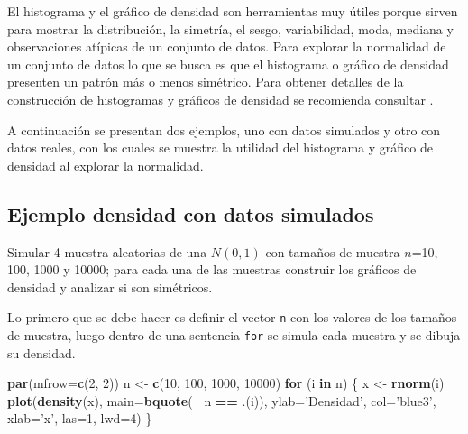 \documentclass[10pt,]{krantz}
\makeatletter
\newenvironment{Shaded}{\begin{snugshade}}{\end{snugshade}}
\newcommand{\KeywordTok}[1]{\textcolor[rgb]{0.13,0.29,0.53}{\textbf{#1}}}
\newcommand{\DataTypeTok}[1]{\textcolor[rgb]{0.13,0.29,0.53}{#1}}
\newcommand{\DecValTok}[1]{\textcolor[rgb]{0.00,0.00,0.81}{#1}}
\newcommand{\StringTok}[1]{\textcolor[rgb]{0.31,0.60,0.02}{#1}}
\newcommand{\ControlFlowTok}[1]{\textcolor[rgb]{0.13,0.29,0.53}{\textbf{#1}}}
\newcommand{\OperatorTok}[1]{\textcolor[rgb]{0.81,0.36,0.00}{\textbf{#1}}}
\newcommand{\NormalTok}[1]{#1}
\newenvironment{kframe}{%
\medskip{}
\setlength{\fboxsep}{.8em}
 \def\at@end@of@kframe{}%
 \ifinner\ifhmode%
  \def\at@end@of@kframe{\end{minipage}}%
  \begin{minipage}{\columnwidth}%
 \fi\fi%
 \def\FrameCommand##1{\hskip\@totalleftmargin \hskip-\fboxsep
 \colorbox{shadecolor}{##1}\hskip-\fboxsep
     \hskip-\linewidth \hskip-\@totalleftmargin \hskip\columnwidth}%
 \MakeFramed {\advance\hsize-\width
   \@totalleftmargin\z@ \linewidth\hsize
   \@setminipage}}%
 {\par\unskip\endMakeFramed%
 \at@end@of@kframe}
\renewenvironment{Shaded}{\begin{kframe}}{\end{kframe}}
\makeatother
\begin{document}
El histograma y el gráfico de densidad son herramientas muy útiles
porque sirven para mostrar la distribución, la simetría, el sesgo,
variabilidad, moda, mediana y observaciones atípicas de un conjunto de
datos. Para explorar la normalidad de un conjunto de datos lo que se
busca es que el histograma o gráfico de densidad presenten un patrón más
o menos simétrico. Para obtener detalles de la construcción de
histogramas y gráficos de densidad se recomienda consultar
\citet{hernandez_correa}.

A continuación se presentan dos ejemplos, uno con datos simulados y otro
con datos reales, con los cuales se muestra la utilidad del histograma y
gráfico de densidad al explorar la normalidad.

\subsection*{Ejemplo densidad con datos
simulados}\label{ejemplo-densidad-con-datos-simulados}


Simular 4 muestra aleatorias de una \(N(0, 1)\) con tamaños de muestra
\(n\)=10, 100, 1000 y 10000; para cada una de las muestras construir los
gráficos de densidad y analizar si son simétricos.

Lo primero que se debe hacer es definir el vector \texttt{n} con los
valores de los tamaños de muestra, luego dentro de una sentencia
\texttt{for} se simula cada muestra y se dibuja su densidad.

\begin{Shaded}
\begin{Highlighting}[]
\KeywordTok{par}\NormalTok{(}\DataTypeTok{mfrow=}\KeywordTok{c}\NormalTok{(}\DecValTok{2}\NormalTok{, }\DecValTok{2}\NormalTok{))}
\NormalTok{n <-}\StringTok{ }\KeywordTok{c}\NormalTok{(}\DecValTok{10}\NormalTok{, }\DecValTok{100}\NormalTok{, }\DecValTok{1000}\NormalTok{, }\DecValTok{10000}\NormalTok{)}
\ControlFlowTok{for}\NormalTok{ (i }\ControlFlowTok{in}\NormalTok{ n) \{}
\NormalTok{  x <-}\StringTok{ }\KeywordTok{rnorm}\NormalTok{(i)}
  \KeywordTok{plot}\NormalTok{(}\KeywordTok{density}\NormalTok{(x), }\DataTypeTok{main=}\KeywordTok{bquote}\NormalTok{(}\OperatorTok{~}\StringTok{ }\NormalTok{n }\OperatorTok{==}\StringTok{ }\NormalTok{.(i)),}
       \DataTypeTok{ylab=}\StringTok{'Densidad'}\NormalTok{, }\DataTypeTok{col=}\StringTok{'blue3'}\NormalTok{, }\DataTypeTok{xlab=}\StringTok{'x'}\NormalTok{, }\DataTypeTok{las=}\DecValTok{1}\NormalTok{, }\DataTypeTok{lwd=}\DecValTok{4}\NormalTok{)}
\NormalTok{\}}
\end{Highlighting}
\end{Shaded}
\end{document}
